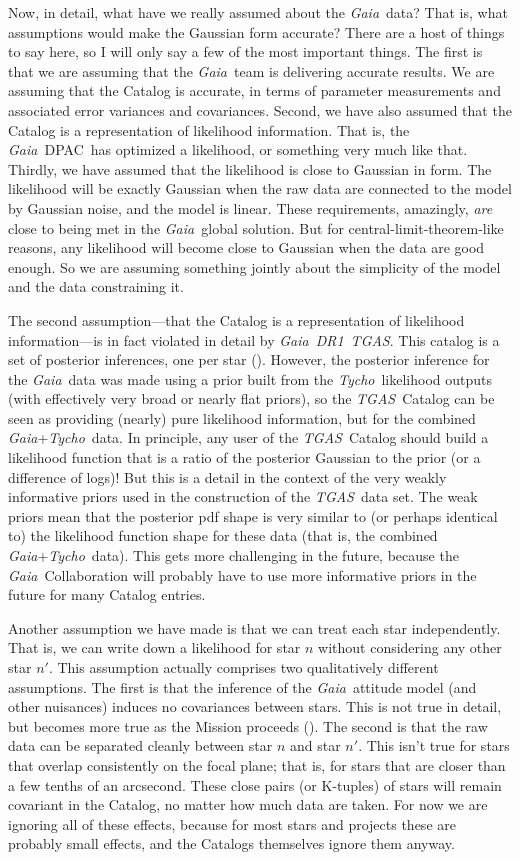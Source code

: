 \documentclass[12pt, modern]{aastex62h}
\newcommand{\acronym}[1]{{\small{#1}}}
\newcommand{\Gaia}{\textsl{Gaia}}
\newcommand{\Tycho}{\textsl{Tycho}}
\newcommand{\DRone}{\textsl{\acronym{DR1}}}
\newcommand{\TGAS}{\textsl{\acronym{TGAS}}}
\newcommand{\DPAC}{{\acronym{DPAC}}}
\begin{document}
Now, in detail, what have we really assumed about the \Gaia\ data?
That is, what assumptions would make the Gaussian form accurate?
There are a host of things to say here, so I will only say a few of the
most important things.
The first is that we are assuming that the \Gaia\ team is delivering
accurate results.
We are assuming that the Catalog is accurate, in terms of parameter
measurements and associated error variances and covariances.
Second, we have also assumed that the Catalog is a representation of likelihood
information.
That is, the \Gaia\ \DPAC\ has optimized a likelihood, or something very much
like that.
Thirdly, we have assumed that the likelihood is close to Gaussian in form.
The likelihood will be exactly Gaussian when the raw data are connected
to the model by Gaussian noise, and the model is linear.
These requirements, amazingly, \emph{are} close to being met in the \Gaia\ global solution.
But for central-limit-theorem-like reasons, any likelihood will become close
to Gaussian when the data are good enough.
So we are assuming something jointly about the simplicity of the model and
the data constraining it.

The second assumption---that the Catalog is a representation of likelihood
information---is in fact violated in detail by \Gaia\ \DRone\ \TGAS.
This catalog is a set of posterior inferences, one per star (\citealt{michalik, dr1}).
However, the posterior inference for the \Gaia\ data was made using a prior
built from the \Tycho\ likelihood outputs (with effectively very broad
or nearly flat priors),
so the \TGAS\ Catalog can be seen as providing (nearly) pure likelihood information,
but for the combined \Gaia +\Tycho\ data.
In principle, any user of the \TGAS\ Catalog should build a likelihood function
that is a ratio of the posterior Gaussian to the prior (or a difference
of logs)!
But this is a detail in the context of the very weakly informative priors
used in the construction of the \TGAS\ data set.
The weak priors mean that the posterior pdf shape is very similar to
(or perhaps identical to) the likelihood
function shape for these data (that is, the combined \Gaia +\Tycho\ data).
This gets more challenging in the future, because the \Gaia\ Collaboration will
probably have to use
more informative priors in the future for many Catalog entries.

Another assumption we have made is that we can treat each star independently.
That is, we can write down a likelihood for star $n$ without considering any
other star $n'$.
This assumption actually comprises two qualitatively different assumptions.
The first is that the inference of the \Gaia\ attitude model (and other nuisances)
induces no covariances between stars.
This is not true in detail, but becomes more true as the Mission proceeds
(\citealt{holl}).
The second is that the raw data can be separated cleanly between star $n$ and
star $n'$.
This isn't true for stars that overlap consistently on the focal plane; that is,
for stars that are closer than a few tenths of an arcsecond.
These close pairs (or K-tuples) of stars will remain covariant in the
Catalog, no matter how much data are taken.
For now we are ignoring all of these effects, because for most stars and projects
these are probably small effects, and the Catalogs themselves ignore
them anyway.
\end{document}
